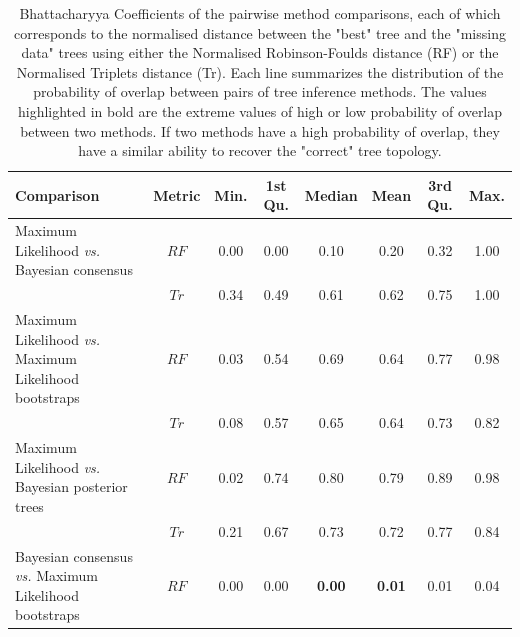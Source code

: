 \documentclass[12pt,letterpaper]{article}
\begin{document}
%    

\newpage

\begin{landscape}
\begin{table}[ht]
\caption{
Bhattacharyya Coefficients of the pairwise method comparisons, each of which corresponds to the normalised distance between the "best" tree and the "missing data" trees using either the Normalised Robinson-Foulds distance (RF) or the Normalised Triplets distance (Tr). Each line summarizes the distribution of the probability of overlap between pairs of tree inference methods. The values highlighted in bold are the extreme values of high or low probability of overlap between two methods. If two methods have a high probability of overlap, they have a similar ability to recover the "correct" tree topology. %
}
\centering
\begin{tabular}{lccccccc}
  \hline
 Comparison &  Metric & Min. & 1st Qu. & Median & Mean & 3rd Qu. & Max. \\ 
  \hline
    Maximum Likelihood \textit{vs.} Bayesian consensus                 & $RF$ & 0.00 & 0.00 & 0.10 & 0.20 & 0.32 & 1.00 \\ 
                                                                       & $Tr$ & 0.34 & 0.49 & 0.61 & 0.62 & 0.75 & 1.00 \\ 
    Maximum Likelihood \textit{vs.} Maximum Likelihood bootstraps      & $RF$ & 0.03 & 0.54 & 0.69 & 0.64 & 0.77 & 0.98 \\ 
                                                                       & $Tr$ & 0.08 & 0.57 & 0.65 & 0.64 & 0.73 & 0.82 \\ 
    Maximum Likelihood \textit{vs.} Bayesian posterior trees           & $RF$ & 0.02 & 0.74 & 0.80 & 0.79 & 0.89 & 0.98 \\ 
                                                                       & $Tr$ & 0.21 & 0.67 & 0.73 & 0.72 & 0.77 & 0.84 \\ 
    Bayesian consensus \textit{vs.} Maximum Likelihood bootstraps      & $RF$ & 0.00 & 0.00 & \textbf{0.00} & \textbf{0.01} & 0.01 & 0.04 \\ 

\end{tabular}
\end{table}
\end{landscape}
\end{document}
